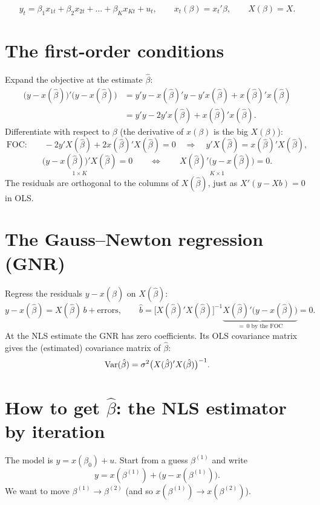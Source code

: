 \documentclass[11pt]{article}
\begin{document}
\[ y_{t} = \beta_{1}x_{1t} + \beta_{2}x_{2t} + \dots + \beta_{K}x_{Kt} + u_{t}, \qquad
   x_{t}(\beta) = x_{t}'\beta, \qquad X(\beta) = X. \]


\section{The first-order conditions}

Expand the objective at the estimate $\hat\beta$:
\begin{align*}
  \bigl(y - x(\hat\beta)\bigr)'\bigl(y - x(\hat\beta)\bigr)
  &= y'y - x(\hat\beta)'y - y'x(\hat\beta) + x(\hat\beta)'x(\hat\beta)\\
  &= y'y - 2y'x(\hat\beta) + x(\hat\beta)'x(\hat\beta).
\end{align*}
Differentiate with respect to $\beta$ (the derivative of $x(\beta)$ is the big $X(\beta)$):
\[ \text{FOC:}\qquad -2y'X(\hat\beta) + 2x(\hat\beta)'X(\hat\beta) = 0
   \quad\Longrightarrow\quad y'X(\hat\beta) = x(\hat\beta)'X(\hat\beta), \]
\[ \underset{1\times K}{\bigl(y - x(\hat\beta)\bigr)'X(\hat\beta)} = 0
   \qquad\Longleftrightarrow\qquad
   \underset{K\times 1}{X(\hat\beta)'\bigl(y - x(\hat\beta)\bigr)} = 0. \]
The residuals are orthogonal to the columns of $X(\hat\beta)$, just as $X'(y - Xb) = 0$ in OLS.


\section{The Gauss--Newton regression (GNR)}

Regress the residuals $y - x(\hat\beta)$ on $X(\hat\beta)$:
\[ y - x(\hat\beta) = X(\hat\beta)\,b + \text{errors}, \qquad
   \hat b = \bigl[X(\hat\beta)'X(\hat\beta)\bigr]^{-1}
            \underbrace{X(\hat\beta)'\bigl(y - x(\hat\beta)\bigr)}_{=\,0 \text{ by the FOC}} = 0. \]
At the NLS estimate the GNR has zero coefficients. Its OLS covariance matrix gives
the (estimated) covariance matrix of $\hat\beta$:
\[ \operatorname{Var}(\hat\beta) = \sigma^{2}\bigl(X(\hat\beta)'X(\hat\beta)\bigr)^{-1}. \]


\section{How to get $\hat\beta$: the NLS estimator by iteration}

The model is $y = x(\beta_{0}) + u$. Start from a guess $\beta^{(1)}$ and write
\[ y = x(\beta^{(1)}) + \bigl(y - x(\beta^{(1)})\bigr). \]
We want to move $\beta^{(1)} \to \beta^{(2)}$ (and so $x(\beta^{(1)}) \to x(\beta^{(2)})$).
\end{document}

